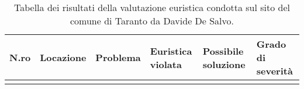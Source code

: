 \begin{longtable}[c]{@{}m{1cm}llllm{2cm}@{}}
	\caption{Tabella dei risultati della valutazione euristica condotta sul sito del comune di Taranto da Davide De Salvo.}
	\label{tab:val-euristica-DavideDeSalvo}\\
	\toprule
	N.ro & Locazione & Problema & Euristica violata & Possibile soluzione & Grado di severità\footnotemark \\* \midrule
	\endhead
\\*
	\bottomrule
\end{longtable}
